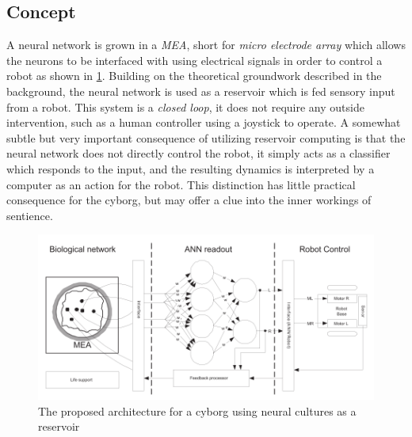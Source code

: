 \subsection{Concept}
A neural network is grown in a \textit{MEA}, short for \textit{micro electrode
 array} which allows the neurons to be interfaced with using electrical signals
in order to control a robot as shown in \ref{fig:cyborg_idea}.
Building on the theoretical groundwork described in the background, the neural
network is used as a reservoir which is fed sensory input from a robot.
This system is a \textit{closed loop}, it does not require any outside
intervention, such as a human controller using a joystick to operate.
A somewhat subtle but very important consequence of utilizing reservoir
computing is that the neural network does not directly control the robot, it
simply acts as a classifier which responds to the input, and the resulting
dynamics is interpreted by a computer as an action for the robot.
This distinction has little practical consequence for the cyborg, but may offer
a clue into the inner workings of sentience.
\begin{figure}[h!]
    \includegraphics[width=\linewidth]{images/cyborg_overview.png}
    \caption{The proposed architecture for a cyborg using neural cultures as a reservoir}
    \label{fig:cyborg_idea}
\end{figure}
